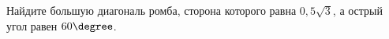 \begin{ex}
	\begin{condition}
		Найдите большую диагональ ромба, сторона которого равна \( 0,5\sqrt{3} \), а острый угол равен \( 60 \degree\).
	\end{condition}
\end{ex}